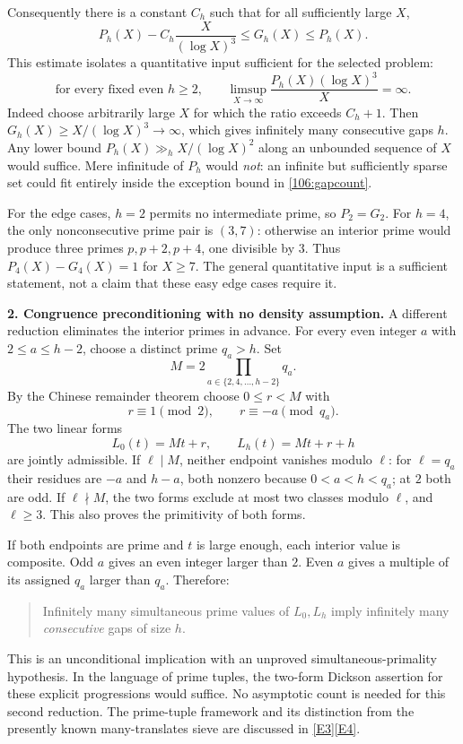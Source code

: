\documentclass[11pt,a4paper]{article}
\newcommand{\eref}[2]{\hyperlink{extra:#1:#2}{[E#2]}}
\numberwithin{equation}{section}
\begin{document}
Consequently there is a constant $C_h$ such that for all sufficiently large
$X$,
\begin{equation}\label{106:gapcount}
 P_h(X)-C_h\frac{X}{(\log X)^3}\leq G_h(X)\leq P_h(X).
\end{equation}
This estimate isolates a quantitative input sufficient for the selected
problem:
\begin{equation}\label{106:pairinput}
 \text{for every fixed even $h\geq2$,}\qquad
 \limsup_{X\to\infty}\frac{P_h(X)(\log X)^3}{X}=\infty.
\end{equation}
Indeed choose arbitrarily large $X$ for which the ratio exceeds $C_h+1$.
Then $G_h(X)\geq X/(\log X)^3\to\infty$, which gives infinitely many
consecutive gaps $h$. Any lower bound $P_h(X)\gg_h X/(\log X)^2$ along an
unbounded sequence of $X$ would suffice. Mere infinitude of $P_h$ would
\emph{not}: an infinite but sufficiently sparse set could fit entirely
inside the exception bound in \eqref{106:gapcount}.

For the edge cases, $h=2$ permits no intermediate prime, so $P_2=G_2$.
For $h=4$, the only nonconsecutive prime pair is $(3,7)$: otherwise an
interior prime would produce three primes $p,p+2,p+4$, one divisible by $3$.
Thus $P_4(X)-G_4(X)=1$ for $X\geq7$. The general quantitative input is a
sufficient statement, not a claim that these easy edge cases require it.

\medskip
\textbf{2. Congruence preconditioning with no density assumption.}
A different reduction eliminates the interior primes in advance. For every
even integer $a$ with $2\leq a\leq h-2$, choose a distinct prime $q_a>h$.
Set
\[
 M=2\prod_{a\in\{2,4,\ldots,h-2\}}q_a.
\]
By the Chinese remainder theorem choose $0\leq r<M$ with
\begin{equation}\label{106:crt}
 r\equiv1\pmod2,\qquad r\equiv-a\pmod{q_a}.
\end{equation}
The two linear forms
\[
 L_0(t)=Mt+r,\qquad L_h(t)=Mt+r+h
\]
are jointly admissible. If $\ell\mid M$, neither endpoint vanishes modulo
$\ell$: for $\ell=q_a$ their residues are $-a$ and $h-a$, both nonzero
because $0<a<h<q_a$; at $2$ both are odd. If $\ell\nmid M$, the two forms
exclude at most two classes modulo $\ell$, and $\ell\geq3$. This also proves
the primitivity of both forms.

If both endpoints are prime and $t$ is large enough, each interior value
is composite. Odd $a$ gives an even integer larger than $2$. Even $a$ gives
a multiple of its assigned $q_a$ larger than $q_a$. Therefore:
\begin{quote}
Infinitely many simultaneous prime values of $L_0,L_h$ imply infinitely
many \emph{consecutive} gaps of size $h$.
\end{quote}
This is an unconditional implication with an unproved simultaneous-primality
hypothesis. In the language of prime tuples, the two-form Dickson assertion
for these explicit progressions would suffice. No asymptotic count is needed
for this second reduction. The prime-tuple framework and its distinction
from the presently known many-translates sieve are discussed in
\eref{106}{3}\eref{106}{4}.
\end{document}
